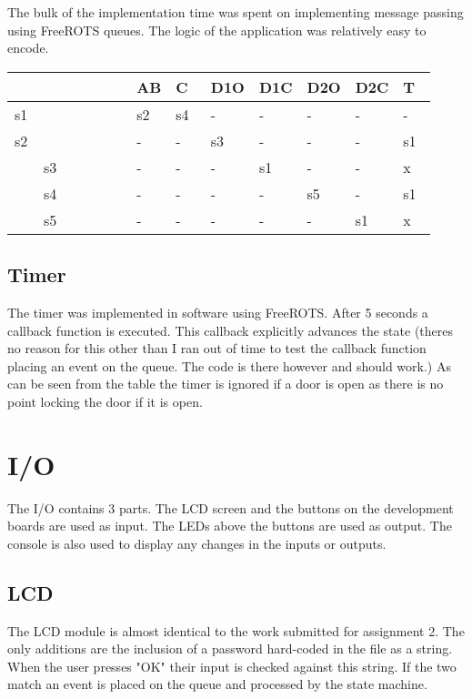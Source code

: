 \documentclass{article}
\begin{document}
The bulk of the implementation time was spent on implementing message passing using FreeROTS queues. The logic of the application was relatively easy to encode.
\begin{center}
    \begin{tabular}{|l|l|l|l|l|l|l|l|}
    \hline
      & AB & C  & D1O & D1C & D2O & D2C & T  \\ \hline
    s1          & s2 & s4 & -   & -   & -   & -   & -  \\ \hline
   	s2          & -  & -  & s3  & -   & -   & -   & s1 \\ \hline
    s3          & -  & -  & -   & s1  & -   & -   & x  \\ \hline
    s4          & -  & -  & -   & -   & s5  & -   & s1 \\ \hline
    s5          & -  & -  & -   & -   & -   & s1  & x  \\
    \hline
    \end{tabular}
\end{center}

\subsection{Timer}
The timer was implemented in software using FreeROTS. After 5 seconds a callback function is executed. This callback explicitly advances the state (theres no reason for this other than I ran out of time to test the callback function placing an event on the queue. The code is there however and should work.) As can be seen from the table the timer is ignored if a door is open as there is no point locking the door if it is open. 



\section{I/O}
The I/O contains 3 parts. The LCD screen and the buttons on the development boards are used as input. The LEDs above the buttons are used as output. The console is also used to display any changes in the inputs or outputs.

\subsection{LCD}
The LCD module is almost identical to the work submitted for assignment 2. The only additions are the inclusion of a password hard-coded in the file as a string. When the user presses "OK" their input is checked against this string. If the two match an event is placed on the queue and processed by the state machine. 
\end{document}

